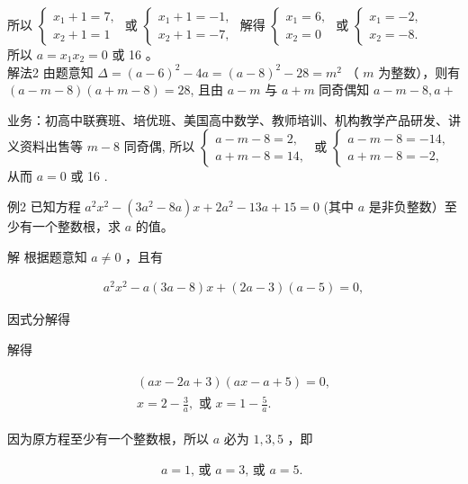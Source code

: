 \documentclass[10pt]{article}
\begin{document}
所以 $\left\{\begin{array}{l}x_{1}+1=7, \\ x_{2}+1=1\end{array}\right.$ 或 $\left\{\begin{array}{l}x_{1}+1=-1, \\ x_{2}+1=-7,\end{array}\right.$ 解得 $\left\{\begin{array}{l}x_{1}=6, \\ x_{2}=0\end{array}\right.$ 或 $\left\{\begin{array}{l}x_{1}=-2, \\ x_{2}=-8 .\end{array}\right.$\\
所以 $a=x_{1} x_{2}=0$ 或 16 。\\
解法2 由题意知 $\Delta=(a-6)^{2}-4 a=(a-8)^{2}-28=m^{2}$ （ $m$ 为整数），则有 $(a-m-8)(a+m-8)=28$, 且由 $a-m$ 与 $a+m$ 同奇偶知 $a-m-8, a+$

业务：初高中联赛班、培优班、美国高中数学、教师培训、机构教学产品研发、讲义资料出售等 $m-8$ 同奇偶, 所以 $\left\{\begin{array}{l}a-m-8=2, \\ a+m-8=14,\end{array}\right.$ 或 $\left\{\begin{array}{l}a-m-8=-14, \\ a+m-8=-2,\end{array}\right.$ 从而 $a=0$ 或 16 .

例2 已知方程 $a^{2} x^{2}-\left(3 a^{2}-8 a\right) x+2 a^{2}-13 a+15=0$ (其中 $a$ 是非负整数）至少有一个整数根，求 $a$ 的值。

解 根据题意知 $a \neq 0$ ，且有

\begin{align*}
a^{2} x^{2}-a(3 a-8) x+(2 a-3)(a-5)=0,
\end{align*}

因式分解得

解得

\begin{align*}
\begin{gathered}
(a x-2 a+3)(a x-a+5)=0, \\
x=2-\frac{3}{a}, \text { 或 } x=1-\frac{5}{a} .
\end{gathered}
\end{align*}

因为原方程至少有一个整数根，所以 $a$ 必为 $1,3,5$ ，即

\begin{align*}
a=1 \text {, 或 } a=3 \text {, 或 } a=5 \text {. }
\end{align*}
\end{document}
